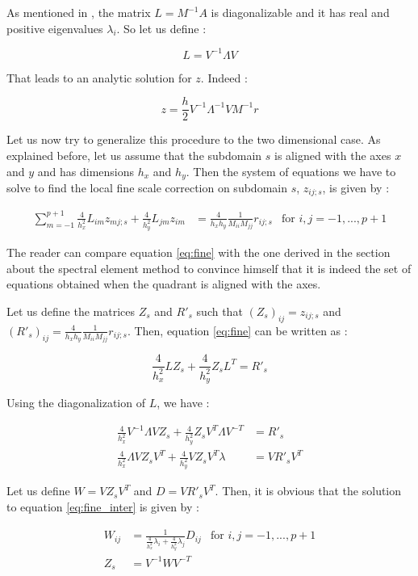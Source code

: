 As mentioned in \cite{remacle}, the matrix $L = M^{-1}A$ is diagonalizable and it has real and positive eigenvalues $\lambda_i$. So let us define : 

$$ L = V^{-1}\Lambda V$$

That leads to an analytic solution for $z$. Indeed : 

$$ z = \frac{h}{2} V^{-1}\Lambda^{-1}V M^{-1}r$$

Let us now try to generalize this procedure to the two dimensional case. As explained before, let us assume that the subdomain $s$ is aligned with the axes $x$ and $y$ and has dimensions $h_x$ and $h_y$. Then the system of equations we have to solve to find the local fine scale correction on subdomain $s$, $z_{ij;s}$, is given by : 

\begin{align}
\sum_{m=-1}^{p+1} \frac{4}{h_x^2}L_{im}z_{mj;s} + \frac{4}{h_y^2} L_{jm}z_{im} &= \frac{4}{h_xh_y}\frac{1}{M_{ii}M_{jj}} r_{ij;s}  &\text{for $i,j=-1,...,p+1$} \label{eq:fine}
\end{align}

The reader can compare equation \ref{eq:fine} with the one derived in the section about the spectral element method to convince himself that it is indeed the set of equations obtained when the quadrant is aligned with the axes. 

Let us define the matrices $Z_s$ and $R'_s$  such that $(Z_s)_{ij} = z_{ij;s}$ and $(R'_s)_{ij} = \frac{4}{h_xh_y}\frac{1}{M_{ii}M_{jj}} r_{ij;s}$. Then, equation \ref{eq:fine} can be written as :

$$\frac{4}{h_x^2} LZ_s + \frac{4}{h_y^2} Z_sL^T = R'_s$$

Using the diagonalization of $L$, we have :

\begin{align}
\frac{4}{h_x^2} V^{-1}\Lambda V Z_s + \frac{4}{h_y^2} Z_s V^T\Lambda V^{-T} &= R'_s \nonumber \\
\frac{4}{h_x^2} \Lambda VZ_sV^T + \frac{4}{h_y^2} VZ_sV^T \lambda &= VR'_sV^T \label{eq:fine_inter}
\end{align}

Let us define $W = VZ_sV^T$ and $D=VR'_sV^T$. Then, it is obvious that the solution to equation \ref{eq:fine_inter} is given by : 

\begin{align*}
W_{ij} &= \frac{1}{\frac{4}{h_x^2}\lambda_i + \frac{4}{h_y^2}\lambda_j}D_{ij} &\text{for $i,j=-1,...,p+1$}\\
Z_s &= V^{-1}WV^{-T}
\end{align*}

